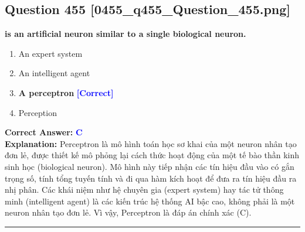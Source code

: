 \documentclass[11pt,a4paper]{article}
\begin{document}
\begin{minipage}{\textwidth}
\subsection*{Question 455 \quad \footnotesize{[0455\_q455\_Question\_455.png]}}
\noindent \textbf{is an artificial neuron similar to a single biological neuron.}

\begin{enumerate}[label=\Alph*.]
    \item An expert system
    \item An intelligent agent
    \item \textbf{A perceptron} \hfill \textcolor{blue}{\textbf{[Correct]}}
    \item Perception
\end{enumerate}

\noindent \textbf{Correct Answer:} \textcolor{blue}{\textbf{C}} \\[2pt]
\noindent \textbf{Explanation:} Perceptron là mô hình toán học sơ khai của một neuron nhân tạo đơn lẻ, được thiết kế mô phỏng lại cách thức hoạt động của một tế bào thần kinh sinh học (biological neuron). Mô hình này tiếp nhận các tín hiệu đầu vào có gắn trọng số, tính tổng tuyến tính và đi qua hàm kích hoạt để đưa ra tín hiệu đầu ra nhị phân. Các khái niệm như hệ chuyên gia (expert system) hay tác tử thông minh (intelligent agent) là các kiến trúc hệ thống AI bậc cao, không phải là một neuron nhân tạo đơn lẻ. Vì vậy, Perceptron là đáp án chính xác (C).

\par\vspace{0.3cm}
\hrule
\vspace{0.3cm}
\end{minipage}
\end{document}
